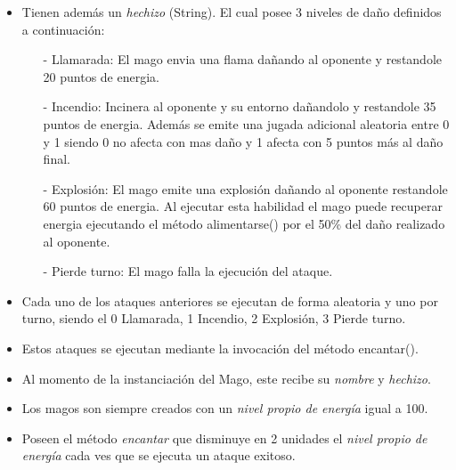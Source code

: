 \documentclass{exam}
\begin{document}
\begin{itemize}
           \begin{itemize}
           \item Tienen adem\'as un \emph{hechizo} (String).  El cual posee 3 niveles de daño definidos a continuaci\'on:
           \begin{itemize}
             \item[-] Llamarada: El mago envia una flama  da\~nando al oponente y restandole 20 puntos de energia.
             \item[-] Incendio: Incinera al oponente y su entorno da\~nandolo y restandole 35 puntos de energia. Adem\'as se emite una jugada adicional aleatoria entre 0 y 1 siendo 0 no afecta con mas daño y 1 afecta con 5 puntos m\'as al daño final.
             \item[-] Explosi\'on: El mago emite una explosi\'on  da\~nando al oponente restandole 60 puntos de energia.  Al ejecutar esta habilidad el mago puede recuperar  energia ejecutando el m\'etodo alimentarse() por el 50\% del da\~no realizado al oponente.
             \item[-] Pierde turno: El mago falla la ejecuci\'on del ataque.
           \end{itemize}
             \item Cada uno de los ataques anteriores se ejecutan  de forma aleatoria y uno por turno, siendo el 0 Llamarada, 1 Incendio, 2 Explosi\'on, 3 Pierde turno.
             \item Estos ataques se ejecutan mediante la invocaci\'on del m\'etodo encantar().
             \item Al momento de la instanciaci\'on del Mago, este recibe su  \emph{nombre} y \emph{hechizo}.
             \item Los magos son siempre creados con un \emph{nivel propio de energ\'ia} igual a 100.
             \item Poseen el m\'etodo \emph{encantar} que disminuye en 2 unidades el \emph{nivel propio de energ\'ia} cada ves que se ejecuta un ataque exitoso.
             \end{itemize}


\end{itemize}
\end{document}

